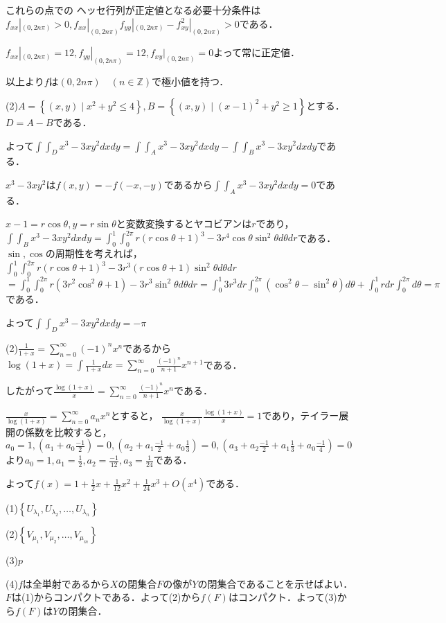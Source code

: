 \documentclass[
		book,
		head_space=20mm,
		foot_space=20mm,
		gutter=10mm,
		line_length=190mm
]{jlreq}
\begin{document}
これらの点での
ヘッセ行列が正定値となる必要十分条件は
$f_{xx}|_{(0,2n\pi)}>0,f_{xx}|_{(0,2n\pi)}f_{yy}|_{(0,2n\pi)}-f_{xy}^2|_{(0,2n\pi)}>0$である．

$f_{xx}|_{(0,2n\pi)}=12,f_{yy}|_{(0,2n\pi)}=12,f_{xy}|_{(0,2n\pi)}=0$よって常に正定値．

以上より$f$は$(0,2n\pi)\quad(n \in \mathbb{Z})$で極小値を持つ．

(2)$A=\left\{ (x,y) \mid x^2+y^2 \le 4 \right\},B=\left\{ (x,y) \mid (x-1)^2+y^2 \ge 1 \right\}$とする．$D=A-B$である．

よって$\int\int_D x^3-3xy^2dxdy=\int\int_A x^3-3xy^2dxdy-\int\int_B x^3-3xy^2dxdy$である．

$x^3-3xy^2$は$f(x,y)=-f(-x,-y)$であるから$\int\int_A x^3-3xy^2dxdy=0$である．

$x-1=r\cos \theta,y=r \sin \theta$と変数変換するとヤコビアンは$r$であり，
$\int\int_B x^3-3xy^2 dxdy = \int_0^1\int_0^{2\pi} r(r\cos \theta + 1)^3-3r^4\cos \theta \sin^2 \theta d\theta dr$である．
$\sin ,\cos$の周期性を考えれば，
$\int_0^1\int_0^{2\pi} r(r\cos \theta + 1)^3-3r^3(r\cos \theta+1) \sin^2 \theta d\theta dr$
$=\int_0^1 \int_0^{2\pi}r(3r^2\cos^2\theta+1)-3r^3\sin^2 \theta d\theta dr=\int_0^1 3r^3 dr\int_0^{2\pi} (\cos^2\theta-\sin^2 \theta)d\theta+\int_0^1 r dr\int_0^{2\pi} d\theta=\pi$である．


よって$\int\int_D x^3-3xy^2dxdy=-\pi$

(2)$\frac{1}{1+x}=\sum\limits_{n=0}^{\infty} (-1)^nx^n$であるから$\log (1+x)=\int\frac{1}{1+x}dx = \sum\limits_{n=0}^{\infty} \frac{(-1)^n}{n+1}x^{n+1}$である．

したがって$\frac{\log(1+x)}{x} = \sum\limits_{n=0}^{\infty} \frac{(-1)^n}{n+1}x^n$である．

$\frac{x}{\log(1+x)}=\sum\limits_{n=0}^{\infty} a_nx^n$とすると，
$\frac{x}{\log(1+x)} \frac{\log(1+x)}{x}=1$であり，テイラー展開の係数を比較すると，$a_0=1,(a_1+a_0\frac{-1}{2})=0,(a_2+a_1\frac{-1}{2}+a_0\frac{1}{3})=0,(a_3+a_2\frac{-1}{2}+a_1\frac{1}{3}+a_0\frac{-1}{4})=0$より$a_0=1,a_1=\frac{1}{2},a_2=\frac{-1}{12},a_3= \frac{1}{24}$である．

よって$f(x)=1+\frac{1}{2}x+\frac{1}{12}x^2+\frac{1}{24}x^3+O(x^4)$である．

(1)$\left\{ U_{\lambda_1},U_{\lambda_2},\dots,U_{\lambda_n} \right\}$

(2)$\left\{ V_{\mu_1},V_{\mu_2},\dots,V_{\mu_m} \right\}$

(3)$p$

(4)$f$は全単射であるから$X$の閉集合$F$の像が$Y$の閉集合であることを示せばよい．$F$は(1)からコンパクトである．よって(2)から$f(F)$はコンパクト．よって(3)から$f(F)$は$Y$の閉集合．
\end{document}

